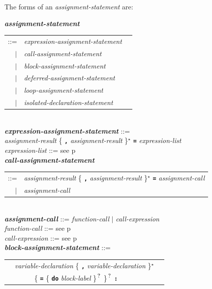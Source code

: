 \documentclass[12pt]{article}
\newcommand{\TT}[1]{{\tt \bfseries #1}}
\newcommand{\STAR}{{\Large $^\star$}}
\newcommand{\QMARK}{{$^{\,\mbox{\footnotesize ?}}$}}
\newcommand{\ttkey}[1]{{\tt \bfseries #1}}
\newcommand{\emkey}[1]{{\em \bfseries #1}}
\newcommand{\pagref}[1]{p\pageref{#1}}
\newenvironment{indpar}[1][0.3in]%
	{\begin{list}{}%
		     {\setlength{\itemsep}{0in}%
		      \setlength{\topsep}{0in}%
		      \setlength{\parsep}{1ex}%
		      \setlength{\labelwidth}{#1}%
		      \setlength{\leftmargin}{#1}%
		      \addtolength{\leftmargin}{\labelsep}}%
	 \item}%
	{\end{list}}
\begin{document}
The forms of an {\em assignment-statement} are:
\begin{indpar}
\emkey{assignment-statement}
    \begin{tabular}[t]{@{}rll}
    ::= & {\em expression-assignment-statement} \\
    $|$ & {\em call-assignment-statement} \\
    $|$ & {\em block-assignment-statement} \\
    $|$ & {\em deferred-assignment-statement} \\
    $|$ & {\em loop-assignment-statement} \\
    $|$ & {\em isolated-declaration-statement} \\
    \end{tabular}
\\[0.5ex]
\emkey{expression-assignment-statement} ::= \\
\hspace*{0.5in} {\em assignment-result}
                \{ \TT{,} {\em assignment-result} \}\STAR{}
		\TT{=} {\em expression-list}
\\[0.5ex]
{\em expression-list} ::= see \pagref{EXPRESSION-LIST}
\\[0.5ex]
\emkey{call-assignment-statement} \\
\hspace*{0.5in} \begin{tabular}{rl}
                ::= & {\em assignment-result}
                      \{ \TT{,} {\em assignment-result} \}\STAR{}
		      \TT{=} {\em assignment-call} \\
		$|$ & {\em assignment-call}
		\end{tabular}
\\[0.5ex]
\emkey{assignment-call} ::= {\em function-call} $|$
                            {\em call-expression}
\\[0.5ex]
{\em function-call} ::= see \pagref{FUNCTION-CALL}
\\[0.5ex]
{\em call-expression} ::= see \pagref{CALL-EXPRESSION}
\\[0.5ex]
\emkey{block-assignment-statement} ::= \\
\hspace*{0.5in}
    \begin{tabular}[t]{@{}rll}
        & {\em variable-declaration}
                \{ \TT{,} {\em variable-declaration} \}\STAR{} \\
	& ~~~~~ \{ \TT{=} \{ \ttkey{do} {\em block-label} \}\QMARK{} \}\QMARK{}
		   \TT{:} \\

\end{tabular}
\end{indpar}
\end{document}
